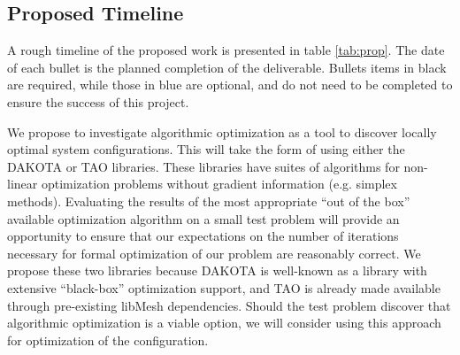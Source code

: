 
\subsection{Proposed Timeline}


%
%
A rough timeline of the proposed work is presented in table
\ref{tab:prop}. The date of each bullet is the planned completion of the
deliverable. Bullets items in black are required, while those in blue
are optional, and do not need to be completed to ensure the
success of this project. 

% 
% 
We propose to investigate algorithmic optimization as a tool to discover
locally optimal system configurations. 
This will take the form of using either the DAKOTA\cite{adams2013dakota}
or TAO\cite{tao-user-ref} libraries. These libraries have suites of
algorithms for non-linear optimization problems without gradient
information (e.g. simplex methods). Evaluating the results of the most
appropriate ``out of the box'' available optimization algorithm on a
small test problem will provide an opportunity to ensure that our
expectations on the number of iterations necessary for formal
optimization of our problem are reasonably correct. 
We propose these two libraries because DAKOTA is well-known as a library
with extensive ``black-box'' optimization support, and TAO is already
made available through pre-existing libMesh dependencies. Should the
test problem discover that algorithmic optimization is a viable option,
we will consider using this approach for optimization of the
configuration. 

